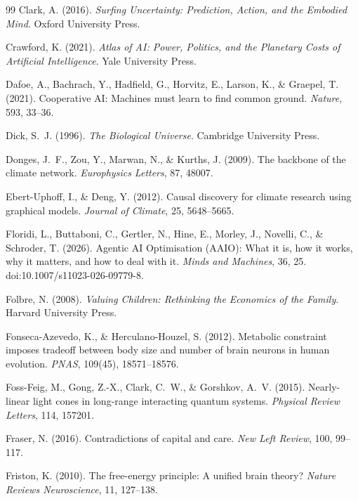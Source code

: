 \documentclass[11pt,twocolumn]{article}
\begin{document}
\begin{thebibliography}{99}
 Clark, A. (2016). \emph{Surfing Uncertainty: Prediction, Action, and the Embodied Mind}. Oxford University Press.

 Crawford, K. (2021). \emph{Atlas of AI: Power, Politics, and the Planetary Costs of Artificial Intelligence}. Yale University Press.

 Dafoe, A., Bachrach, Y., Hadfield, G., Horvitz, E., Larson, K., \& Graepel, T. (2021). Cooperative AI: Machines must learn to find common ground. \emph{Nature}, 593, 33--36.

 Dick, S.~J. (1996). \emph{The Biological Universe}. Cambridge University Press.

 Donges, J.~F., Zou, Y., Marwan, N., \& Kurths, J. (2009). The backbone of the climate network. \emph{Europhysics Letters}, 87, 48007.

 Ebert-Uphoff, I., \& Deng, Y. (2012). Causal discovery for climate research using graphical models. \emph{Journal of Climate}, 25, 5648--5665.

 Floridi, L., Buttaboni, C., Gertler, N., Hine, E., Morley, J., Novelli, C., \& Schroder, T. (2026). Agentic AI Optimisation (AAIO): What it is, how it works, why it matters, and how to deal with it. \emph{Minds and Machines}, 36, 25. doi:10.1007/s11023-026-09779-8.

 Folbre, N. (2008). \emph{Valuing Children: Rethinking the Economics of the Family}. Harvard University Press.

 Fonseca-Azevedo, K., \& Herculano-Houzel, S. (2012). Metabolic constraint imposes tradeoff between body size and number of brain neurons in human evolution. \emph{PNAS}, 109(45), 18571--18576.

 Foss-Feig, M., Gong, Z.-X., Clark, C.~W., \& Gorshkov, A.~V. (2015). Nearly-linear light cones in long-range interacting quantum systems. \emph{Physical Review Letters}, 114, 157201.

 Fraser, N. (2016). Contradictions of capital and care. \emph{New Left Review}, 100, 99--117.

 Friston, K. (2010). The free-energy principle: A unified brain theory? \emph{Nature Reviews Neuroscience}, 11, 127--138.


\end{thebibliography}
\end{document}

